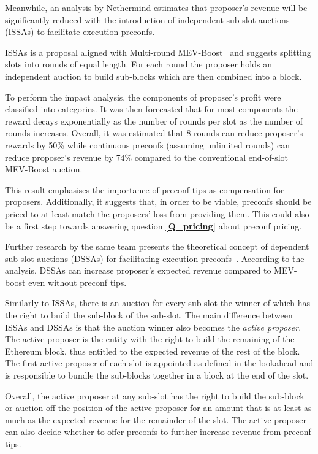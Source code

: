 \documentclass[a4paper]{article}
\theoremstyle{boldstyle}
\begin{document}
    Meanwhile, an analysis by Nethermind \cite{W:EstimatingtheRevenuefromIndependentSub-SlotAuctionPreconfirmations} estimates that proposer's revenue will be significantly reduced with the introduction of independent sub-slot auctions (ISSAs) to facilitate execution preconfs.
        
    ISSAs is a proposal aligned with Multi-round MEV-Boost~\cite{W:BasedPreconfirmationswithMulti-roundMEV-Boost} and suggests splitting slots into rounds of equal length. For each round the proposer holds an independent auction to build sub-blocks which are then combined into a block.

    To perform the impact analysis, the components of proposer's profit were classified into categories. It was then forecasted that for most components the reward decays exponentially as the number of rounds per slot as the number of rounds increases. Overall, it was estimated that 8 rounds can reduce proposer's rewards by 50\% while continuous preconfs (assuming unlimited rounds) can reduce proposer's revenue by 74\% compared to the conventional end-of-slot MEV-Boost auction.

    This result emphasises the importance of preconf tips as compensation for proposers. Additionally, it suggests that, in order to be viable, preconfs should be priced to at least match the proposers' loss from providing them. This could also be a first step towards answering question \textbf{\ref{Q_pricing}} about preconf pricing.
    
    Further research by the same team presents the theoretical concept of dependent sub-slot auctions (DSSAs) for facilitating execution preconfs~\cite{W:AnalysingExpectedProposerRevenuefromPreconfirmations}. According to the analysis, DSSAs can increase proposer's expected revenue compared to MEV-boost even without preconf tips.

    Similarly to ISSAs, there is an auction for every sub-slot the winner of which has the right to build the sub-block of the sub-slot. The main difference between ISSAs and DSSAs is that the auction winner also becomes the \textit{active proposer}. The active proposer is the entity with the right to build the remaining of the Ethereum block, thus entitled to the expected revenue of the rest of the block. The first active proposer of each slot is appointed as defined in the lookahead and is responsible to bundle the sub-blocks together in a block at the end of the slot.

    Overall, the active proposer at any sub-slot has the right to build the sub-block or auction off the position of the active proposer for an amount that is at least as much as the expected revenue for the remainder of the slot. The active proposer can also decide whether to offer preconfs to further increase revenue from preconf tips.
\end{document}
